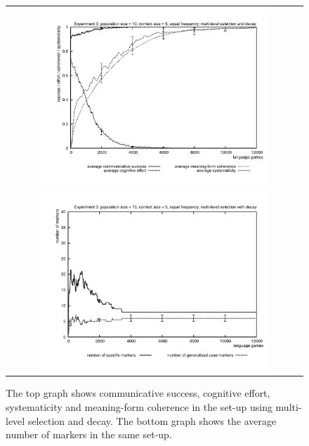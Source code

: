 \begin{figure}[p]
\centering
\begin{tabular}{c}
{\includegraphics[width=0.8\textwidth]{Chapter4/figs/systematicity3b}}
\\
{\includegraphics[width=0.8\textwidth]{Chapter4/figs/markers3-decay}}
\end{tabular}
\caption[Experiment 3: results for set-up 4]{The top graph shows communicative success, cognitive effort, systematicity and meaning-form coherence in the set-up using multi-level selection and decay. The bottom graph shows the average number of markers in the same set-up.}
\label{f:multi-level-decay}
\end{figure}

